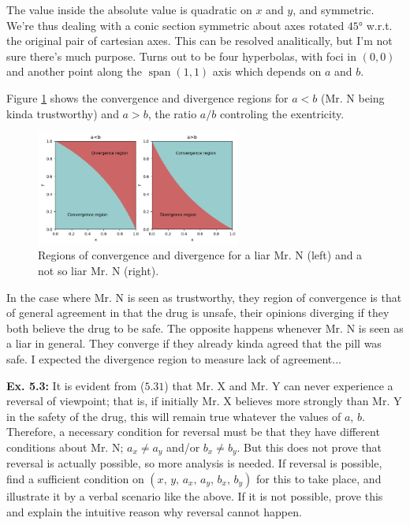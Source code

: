 \documentclass{article}
\newcommand\oname{\operatorname}
\begin{document}
The value inside the absolute value is quadratic on $x$ and $y$, and symmetric. We're thus dealing with a conic section symmetric about axes rotated $45°$ w.r.t. the original pair of cartesian axes. This can be resolved analitically, but I'm not sure there's much purpose. Turns out to be four hyperbolas, with foci in $(0, 0)$ and another point along the $\oname{span}(1, 1)$ axis which depends on $a$ and $b$.

Figure \ref{fig:5.2} shows the convergence and divergence regions for $a<b$ (Mr. N being kinda trustworthy) and $a>b$, the ratio $a/b$ controling the exentricity.

\begin{figure}[h]
	\center
	\includegraphics[width=0.6\textwidth]{Numerical/5.2.png}
	\caption{Regions of convergence and divergence for a liar Mr. N (left) and a not so liar Mr. N (right).}
	\label{fig:5.2}
\end{figure}

In the case where Mr. N is seen as trustworthy, they region of convergence is that of general agreement in that the drug is unsafe, their opinions diverging if they both believe the drug to be safe. The opposite happens whenever Mr. N is seen as a liar in general. They converge if they already kinda agreed that the pill was safe. I expected the divergence region to measure lack of agreement...

\textbf{Ex. 5.3: }It is evident from ($5.31$) that Mr. X and Mr. Y can never experience a reversal of viewpoint; that is, if initially Mr. X believes more strongly than Mr. Y in the safety of the drug, this will remain true whatever the values of $a$, $b$. Therefore, a necessary condition for reversal must be that they have different conditions about Mr. N; $a_x\neq a_y$ and/or $b_x\neq b_y$. But this does not prove that reversal is actually possible, so more analysis is needed. If reversal is possible, find a sufficient condition on $(x,\,y,\,a_x,\,a_y,\,b_x,\,b_y)$ for this to take place, and illustrate it by a verbal scenario like the above. If it is not possible, prove this and explain the intuitive reason why reversal cannot happen.
\end{document}
